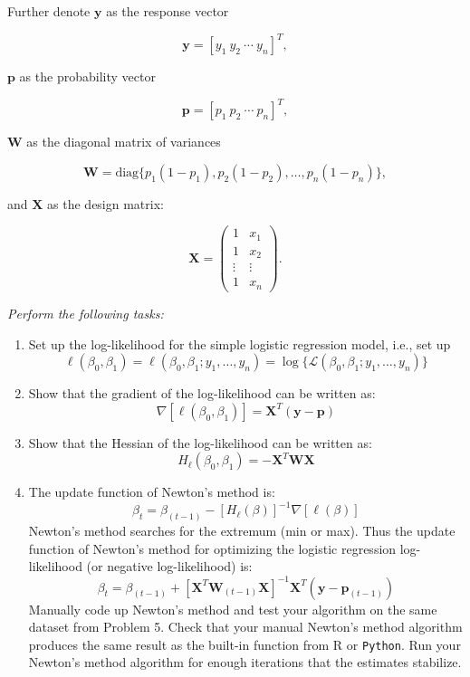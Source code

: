 \documentclass[letterpaper]{article}
\begin{document}
	Further denote $\mathbf{y}$ as the response vector
	
	\[
	\mathbf{y} = [y_1 \ y_2 \ \cdots \ y_n]^T,
	\]
	
	$\mathbf{p}$ as the probability vector
	
	\[
	\mathbf{p} = [p_1 \ p_2 \ \cdots \ p_n]^T,
	\]
	
	$\mathbf{W}$ as the diagonal matrix of variances
	
	\[
	\mathbf{W} = \text{diag}\{p_1(1-p_1), p_2(1-p_2), \ldots, p_n(1-p_n)\},
	\]
	
	and $\mathbf{X}$ as the design matrix:
	
	\[
	\mathbf{X} = \begin{pmatrix} 1 & x_1 \\ 1 & x_2 \\ \vdots & \vdots \\ 1 & x_n \end{pmatrix}.
	\]
	
	\textit{Perform the following tasks:}
	
	\begin{enumerate}
		\item Set up the log-likelihood for the simple logistic regression model, i.e., set up
		\[
		\ell(\beta_0, \beta_1) = \ell(\beta_0, \beta_1; y_1, \ldots, y_n) = \log\{\mathcal{L}(\beta_0, \beta_1; y_1, \ldots, y_n)\}
		\]
		
		\item Show that the gradient of the log-likelihood can be written as:
		\[
		\nabla[\ell(\beta_0, \beta_1)] = \mathbf{X}^T(\mathbf{y} - \mathbf{p})
		\]
		
		\item Show that the Hessian of the log-likelihood can be written as:
		\[
		H_\ell(\beta_0, \beta_1) = -\mathbf{X}^T\mathbf{W}\mathbf{X}
		\]
		
		\item The update function of Newton's method is:
		\[
		\beta_t = \beta_{(t-1)} - [H_\ell(\beta)]^{-1}\nabla[\ell(\beta)]
		\]
		Newton's method searches for the extremum (min or max). Thus the update function of Newton's method for optimizing the logistic regression log-likelihood (or negative log-likelihood) is:
		\[
		\beta_t = \beta_{(t-1)} + [\mathbf{X}^T\mathbf{W}_{(t-1)}\mathbf{X}]^{-1}\mathbf{X}^T(\mathbf{y} - \mathbf{p}_{(t-1)})
		\]
		Manually code up Newton's method and test your algorithm on the same dataset from Problem 5. Check that your manual Newton's method algorithm produces the same result as the built-in function from R or \texttt{Python}. Run your Newton's method algorithm for enough iterations that the estimates stabilize.
	\end{enumerate}
	
\end{document}
